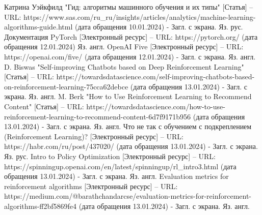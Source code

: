 \documentclass[bachelor, och, referat]{shiza}
\begin{document}
\begin{thebibliography}{3}
    Катрина Уэйкфилд "Гид: алгоритмы машинного обучения и их типы" [Статья] – URL: https://www.sas.com/ru_ru/insights/articles/analytics/machine-learning-algorithms-guide.html (дата обращения 10.01.2024) - Загл. с экрана. Яз. рус.
    Документация PyTorch [Электронный ресурс] – URL: https://pytorch.org/ (дата обращения 12.01.2024) Яз. англ.
    OpenAI Five [Электронный ресурс] – URL: https://openai.com/five/ (дата обращения 12.01.2024) - Загл. с экрана. Яз. англ.
    D. Biswas "Self-improving Chatbots based on Deep Reinforcement Learning" [Статья] – URL: https://towardsdatascience.com/self-improving-chatbots-based-on-reinforcement-learning-75cca62debce (дата обращения 13.01.2024) - Загл. с экрана. Яз. англ.
    M. Berk "How to Use Reinforcement Learning to Recommend Content" [Статья] – URL: https://towardsdatascience.com/how-to-use-reinforcement-learning-to-recommend-content-6d7f9171b956 (дата обращения 13.01.2024) - Загл. с экрана. Яз. англ.
    Что не так с обучением с подкреплением (Reinforcement Learning)? [Электронный ресурс] – URL: https://habr.com/ru/post/437020/ (дата обращения 13.01.2024) - Загл. с экрана. Яз. рус.
    Intro to Policy Optimization [Электронный ресурс] – URL: https://spinningup.openai.com/en/latest/spinningup/rl_intro3.html (дата обращения 13.01.2024) - Загл. с экрана. Яз. англ.
    Evaluation metrics for reinforcement algorithms [Электронный ресурс] – URL: https://medium.com/@barathchandarcse/evaluation-metrics-for-reinforcement-algorithms-ff2bf5869fe4 (дата обращения 13.01.2024) - Загл. с экрана. Яз. англ.
\end{thebibliography}
\end{document}
